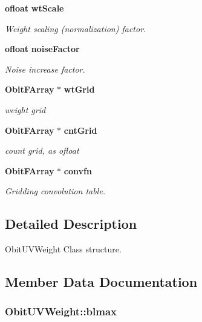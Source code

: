 \begin{CompactItemize}
{\bf ofloat} {\bf wt\-Scale}
\begin{CompactList}\small\item\em Weight scaling (normalization) factor. \item\end{CompactList}\item 
{\bf ofloat} {\bf noise\-Factor}
\begin{CompactList}\small\item\em Noise increase factor. \item\end{CompactList}\item 
{\bf Obit\-FArray} $\ast$ {\bf wt\-Grid}
\begin{CompactList}\small\item\em weight grid \item\end{CompactList}\item 
{\bf Obit\-FArray} $\ast$ {\bf cnt\-Grid}
\begin{CompactList}\small\item\em count grid, as ofloat \item\end{CompactList}\item 
{\bf Obit\-FArray} $\ast$ {\bf convfn}
\begin{CompactList}\small\item\em Gridding convolution table. \item\end{CompactList}\end{CompactItemize}


\subsection{Detailed Description}
Obit\-UVWeight Class structure. 



\subsection{Member Data Documentation}
\subsubsection{ {\bf Obit\-UVWeight::blmax}}\label{structObitUVWeight_o19}


